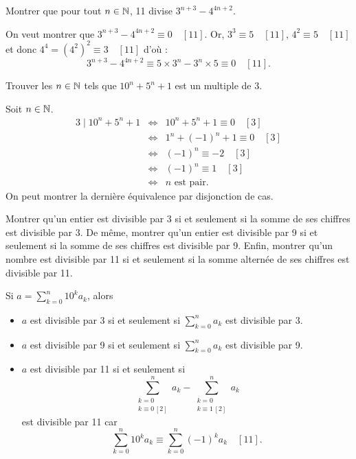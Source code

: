 \documentclass{magnolia}
\begin{document}
\begin{exos}
\exo Montrer que pour tout $n\in\mathbb{N}$, 11 divise $3^{n+3}-4^{4n+2}$.
\begin{sol}
On veut montrer que $3^{n+3}-4^{4n+2} \equiv 0 \quad [11]$.
Or, $3^3\equiv 5 \quad [11]$, $4^2\equiv 5 \quad [11]$ et donc $4^4=(4^2)^2\equiv 3 \quad [11]$ d'où :
$$3^{n+3}-4^{4n+2} \equiv 5\times 3^n-3^n\times 5 \equiv 0 \quad [11].$$
\end{sol}
\exo Trouver les $n\in\mathbb{N}$ tels que $10^n+5^n+1$ est un multiple de 3.
  \begin{sol} Soit $n\in\mathbb{N}$.
  \begin{eqnarray*}
  3\mid 10^n+5^n+1 &\Longleftrightarrow& 10^n+5^n+1 \equiv 0 \quad [3]\\
  &\Longleftrightarrow& 1^n+(-1)^n+1 \equiv 0 \quad [3]\\
  &\Longleftrightarrow& (-1)^n \equiv -2 \quad [3]\\
  &\Longleftrightarrow& (-1)^n \equiv 1 \quad [3]\\
  &\Longleftrightarrow& n \text{ est pair}.
  \end{eqnarray*}
  On peut montrer la dernière équivalence par disjonction de cas.
  \end{sol}
\exo Montrer qu'un entier est divisible par 3 si et seulement si la somme
  de ses chiffres est divisible par 3. De même, montrer qu'un entier est
  divisible par 9 si et seulement si la somme de ses chiffres est divisible
  par 9. Enfin, montrer qu'un nombre est divisible par 11 si et seulement
  si la somme alternée de ses chiffres est divisible par 11.
  \begin{sol}
  Si $a=\sum_{k=0}^n 10^k a_k$, alors
  \begin{itemize}
  \item $a$ est divisible par 3 si et seulement si $\sum_{k=0}^n a_k$ est
    divisible par 3.
  \item $a$ est divisible par 9 si et seulement si $\sum_{k=0}^n a_k$ est
    divisible par 9.
  \item $a$ est divisible par 11 si et seulement si
    \[\sum_{\substack{k=0\\k\equiv 0\,[2]}}^n a_k-
       \sum_{\substack{k=0\\k\equiv 1\,[2]}}^n a_k\] est divisible par 11 car $$\sum_{k=0}^n 10^k a_k\equiv \sum_{k=0}^n (-1)^k a_k \quad [11].$$
  \end{itemize}
  \end{sol}
\end{exos}
\end{document}
